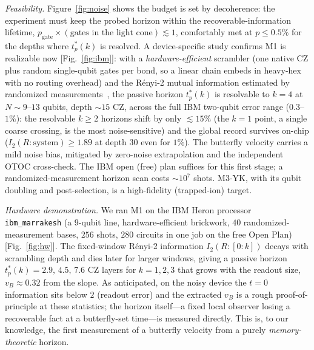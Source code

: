 \documentclass[aps,prxquantum,twocolumn,superscriptaddress,longbibliography]{revtex4-2}
\newcommand{\vB}{v_{B}}
\begin{document}
\emph{Feasibility.} Figure~\ref{fig:noise} shows the budget is set by decoherence: the experiment
must keep the probed horizon within the recoverable-information lifetime, $p_{\mathrm{gate}}\times
(\text{gates in the light cone})\lesssim1$, comfortably met at $p\le0.5\%$ for the depths where
$t^{*}_{p}(k)$ is resolved. A device-specific study confirms M1 is realizable now
[Fig.~\ref{fig:ibm}]: with a \emph{hardware-efficient} scrambler (one native CZ plus random
single-qubit gates per bond, so a linear chain embeds in heavy-hex with no routing overhead) and
the Rényi-2 mutual information estimated by randomized measurements~\cite{brydges2019}, the
passive horizon $t^{*}_{p}(k)$ is resolvable to $k=4$ at $N\sim9$--$13$ qubits, depth $\sim15$ CZ,
across the full IBM two-qubit error range ($0.3$--$1\%$): the resolvable $k\ge2$ horizons shift by
only $\lesssim15\%$ (the $k{=}1$ point, a single coarse crossing, is the most noise-sensitive) and
the global record survives on-chip ($I_{2}(R{:}\mathrm{system})\ge1.89$ at depth 30 even for $1\%$). The butterfly velocity carries a mild noise bias, mitigated by
zero-noise extrapolation and the independent OTOC cross-check. The IBM open (free) plan suffices
for this first stage; a randomized-measurement horizon scan costs $\sim10^{7}$ shots. M3-YK, with
its qubit doubling and post-selection, is a high-fidelity (trapped-ion) target.

\emph{Hardware demonstration.} We ran M1 on the IBM Heron processor \texttt{ibm\_marrakesh} (a
$9$-qubit line, hardware-efficient brickwork, $40$ randomized-measurement bases, $256$ shots,
$280$ circuits in one job on the free Open Plan) [Fig.~\ref{fig:hw}]. The fixed-window Rényi-2
information $I_{2}(R{:}[0{:}k])$ decays with scrambling depth and dies later for larger windows,
giving a passive horizon $t^{*}_{p}(k)=2.9,\,4.5,\,7.6$ CZ layers for $k=1,2,3$ that grows with
the readout size, $\vB\approx0.32$ from the slope. As anticipated, on the noisy device the
$t{=}0$ information sits below $2$ (readout error) and the extracted $\vB$ is a rough
proof-of-principle at these statistics; the horizon itself---a fixed local observer losing a
recoverable fact at a butterfly-set time---is measured directly. This is, to our knowledge, the
first measurement of a butterfly velocity from a purely \emph{memory-theoretic} horizon.
\end{document}
